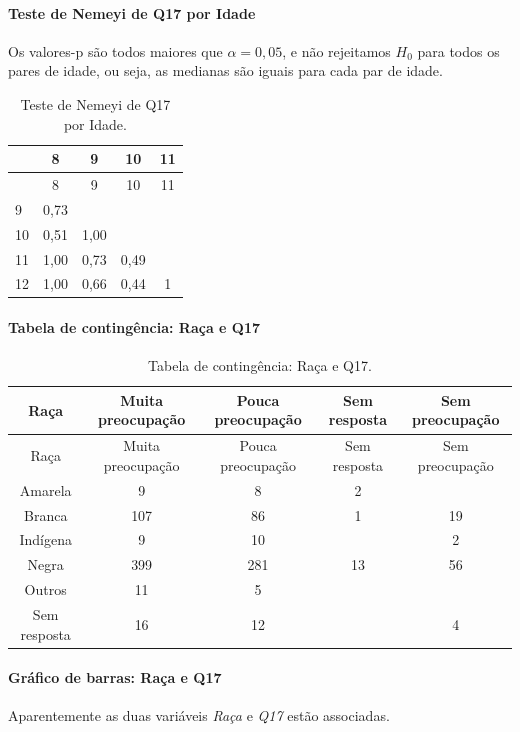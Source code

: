 \documentclass[]{article}
\let\oldparagraph\paragraph
\renewcommand{\paragraph}[1]{\oldparagraph{#1}\mbox{}}
\begin{document}
\hypertarget{teste-de-nemeyi-de-q17-por-idade}{%
\paragraph{Teste de Nemeyi de Q17 por Idade}\label{teste-de-nemeyi-de-q17-por-idade}}

Os valores-p são todos maiores que \(\alpha=0,05\), e não rejeitamos \(H_0\) para todos os pares de idade, ou seja, as medianas são iguais para cada par de idade.

\begin{longtable}[]{@{}lcccc@{}}
\caption{\label{tab:unnamed-chunk-201}Teste de Nemeyi de Q17 por Idade.}\tabularnewline
\toprule
& 8 & 9 & 10 & 11\tabularnewline
\midrule
\endfirsthead
\toprule
& 8 & 9 & 10 & 11\tabularnewline
\midrule
\endhead
9 & 0,73 & & &\tabularnewline
10 & 0,51 & 1,00 & &\tabularnewline
11 & 1,00 & 0,73 & 0,49 &\tabularnewline
12 & 1,00 & 0,66 & 0,44 & 1\tabularnewline
\bottomrule
\end{longtable}

\cleardoublepage

\hypertarget{tabela-de-continguxeancia-rauxe7a-e-q17}{%
\paragraph{Tabela de contingência: Raça e Q17}\label{tabela-de-continguxeancia-rauxe7a-e-q17}}

\begin{longtable}[]{@{}ccccc@{}}
\caption{\label{tab:unnamed-chunk-202}Tabela de contingência: Raça e Q17.}\tabularnewline
\toprule
Raça & Muita preocupação & Pouca preocupação & Sem resposta & Sem preocupação\tabularnewline
\midrule
\endfirsthead
\toprule
Raça & Muita preocupação & Pouca preocupação & Sem resposta & Sem preocupação\tabularnewline
\midrule
\endhead
Amarela & 9 & 8 & 2 &\tabularnewline
Branca & 107 & 86 & 1 & 19\tabularnewline
Indígena & 9 & 10 & & 2\tabularnewline
Negra & 399 & 281 & 13 & 56\tabularnewline
Outros & 11 & 5 & &\tabularnewline
Sem resposta & 16 & 12 & & 4\tabularnewline
\bottomrule
\end{longtable}

\hypertarget{gruxe1fico-de-barras-rauxe7a-e-q17}{%
\paragraph{Gráfico de barras: Raça e Q17}\label{gruxe1fico-de-barras-rauxe7a-e-q17}}

Aparentemente as duas variáveis \emph{Raça} e \emph{Q17} estão associadas.
\end{document}
